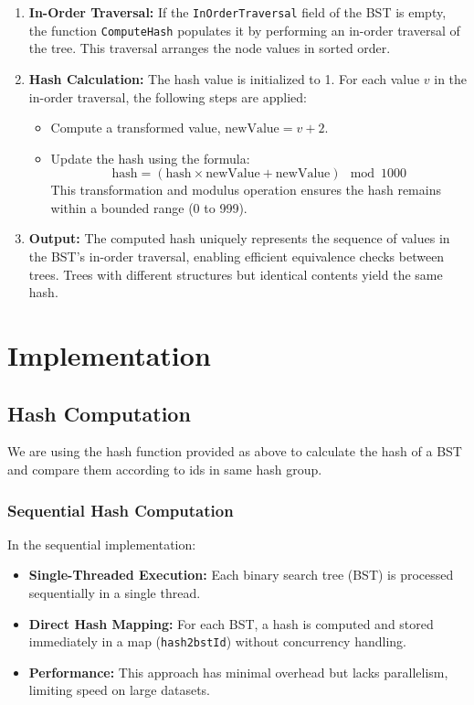 \documentclass[letterpaper,12pt]{article}
\theoremstyle{remark}
\begin{document}
\begin{enumerate}
    \item \textbf{In-Order Traversal:} If the \texttt{InOrderTraversal} field of the BST is empty, the function \texttt{ComputeHash} populates it by performing an in-order traversal of the tree. This traversal arranges the node values in sorted order.
    
    \item \textbf{Hash Calculation:} The hash value is initialized to 1. For each value \( v \) in the in-order traversal, the following steps are applied:
    \begin{itemize}
        \item Compute a transformed value, \( \text{newValue} = v + 2 \).
        \item Update the hash using the formula:
        \[
        \text{hash} = (\text{hash} \times \text{newValue} + \text{newValue}) \mod 1000
        \]
        This transformation and modulus operation ensures the hash remains within a bounded range (0 to 999).
    \end{itemize}
    
    \item \textbf{Output:} The computed hash uniquely represents the sequence of values in the BST’s in-order traversal, enabling efficient equivalence checks between trees. Trees with different structures but identical contents yield the same hash.
\end{enumerate}
      


\section{Implementation}
\subsection{Hash Computation}
We are using the hash function provided as above to calculate the hash of a BST and compare them according to ids in same hash group.
\subsubsection{Sequential Hash Computation}

In the sequential implementation:
\begin{itemize}
    \item \textbf{Single-Threaded Execution:} Each binary search tree (BST) is processed sequentially in a single thread.
    \item \textbf{Direct Hash Mapping:} For each BST, a hash is computed and stored immediately in a map (\texttt{hash2bstId}) without concurrency handling.
    \item \textbf{Performance:} This approach has minimal overhead but lacks parallelism, limiting speed on large datasets.
\end{itemize}
\end{document}

